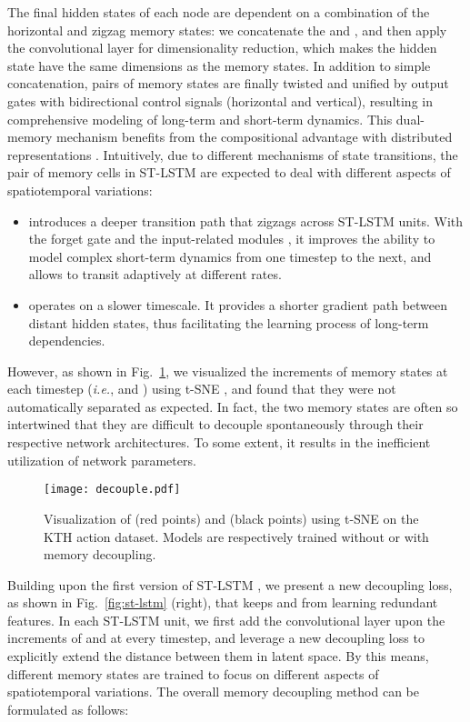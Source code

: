 \documentclass[10pt,journal,compsoc]{IEEEtran}
\newcommand{\fig}[1]{Fig.~\ref{#1}}
\begin{document}
The final hidden states  of each node are dependent on a combination of the horizontal and zigzag memory states: we concatenate the  and , and then apply the  convolutional layer for dimensionality reduction, which makes the hidden state  have the same dimensions as the memory states. 
In addition to simple concatenation, pairs of memory states are finally twisted and unified by output gates with bidirectional control signals (horizontal and vertical), resulting in comprehensive modeling of long-term and short-term dynamics.
This dual-memory mechanism benefits from the compositional advantage with distributed representations \cite{hinton1984distributed,bengio2000taking}.  
Intuitively, due to different mechanisms of state transitions, the pair of memory cells in ST-LSTM are expected to deal with different aspects of spatiotemporal variations:
\begin{itemize}[leftmargin=*]
    \item  introduces a deeper transition path that zigzags across ST-LSTM units. With the forget gate  and the input-related modules , it improves the ability to model complex short-term dynamics from one timestep to the next, and allows  to transit adaptively at different rates.
    \item  operates on a slower timescale. It provides a shorter gradient path between distant hidden states, thus facilitating the learning process of long-term dependencies.
\end{itemize}


However, as shown in \fig{fig:decouple}, we visualized the increments of memory states at each timestep (\textit{i.e.},  and ) using t-SNE \cite{maaten2008visualizing}, and found that they were not automatically separated as expected.
In fact, the two memory states are often so intertwined that they are difficult to decouple spontaneously through their respective network architectures.
To some extent, it results in the inefficient utilization of network parameters.


\begin{figure}[t]
  \centering
  \texttt{[image: decouple.pdf]}
  \vskip -0.1in
  \caption{Visualization of  (red points) and  (black points) using t-SNE \cite{maaten2008visualizing} on the KTH action dataset. Models are respectively trained without or with memory decoupling.}
  \label{fig:decouple}
  \vspace{-10pt}
\end{figure}


Building upon the first version of ST-LSTM \cite{wang2017predrnn}, we present a new decoupling loss, as shown in \fig{fig:st-lstm} (right), that keeps  and  from learning redundant features.
In each ST-LSTM unit, we first add the convolutional layer upon the increments of  and  at every timestep, and leverage a new decoupling loss to explicitly extend the distance between them in latent space. 
By this means, different memory states are trained to focus on different aspects of spatiotemporal variations.
The overall memory decoupling method can be formulated as follows:
\end{document}
